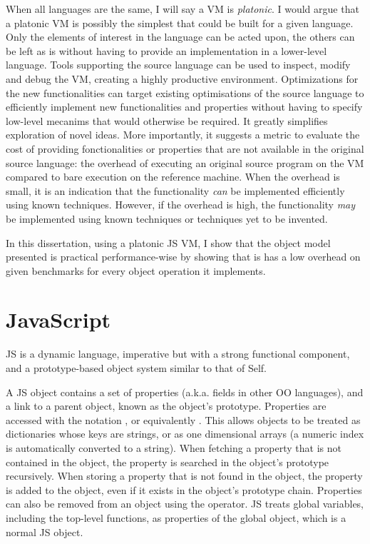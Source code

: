 When all languages are the same, I will say a VM is \textit{platonic}.  I would
argue that a platonic VM is possibly the simplest that could be built for a
given language. Only the elements of interest in the language can be acted
upon, the others can be left as is without having to provide an implementation
in a lower-level language.  Tools supporting the source language can be used to
inspect, modify and debug the VM, creating a highly productive environment.
Optimizations for the new functionalities can target existing optimisations of
the source language to efficiently implement new functionalities and properties
without having to specify low-level mecanims that would otherwise be required.
It greatly simplifies exploration of novel ideas. More importantly, it suggests
a metric to evaluate the cost of providing fonctionalities or properties that
are not available in the original source language: the overhead of executing an
original source program on the VM compared to bare execution on the reference
machine. When the overhead is small, it is an indication that the functionality
\textit{can} be implemented efficiently using known techniques. However, if the
overhead is high, the functionality \textit{may} be implemented using known
techniques or techniques yet to be invented.

In this dissertation, using a platonic JS VM, I show that the object model
presented is practical performance-wise by showing that is has a low
overhead on given benchmarks for every object operation it implements. 

\section{JavaScript}

JS is a dynamic language, imperative but with a strong functional component,
and a prototype-based object system similar to that of Self.

A JS object contains a set of properties (a.k.a. fields in other OO languages),
and a link to a parent object, known as the object's prototype. Properties are
accessed with the notation , or equivalently .
This allows objects to be treated as dictionaries whose keys are strings, or as
one dimensional arrays (a numeric index is automatically converted to a
string).  When fetching a property that is not contained in the object, the
property is searched in the object's prototype recursively. When storing a
property that is not found in the object, the property is added to the object,
even if it exists in the object's prototype chain. Properties can also be
removed from an object using the  operator. JS treats global
variables, including the top-level functions, as properties of the global
object, which is a normal JS object.

